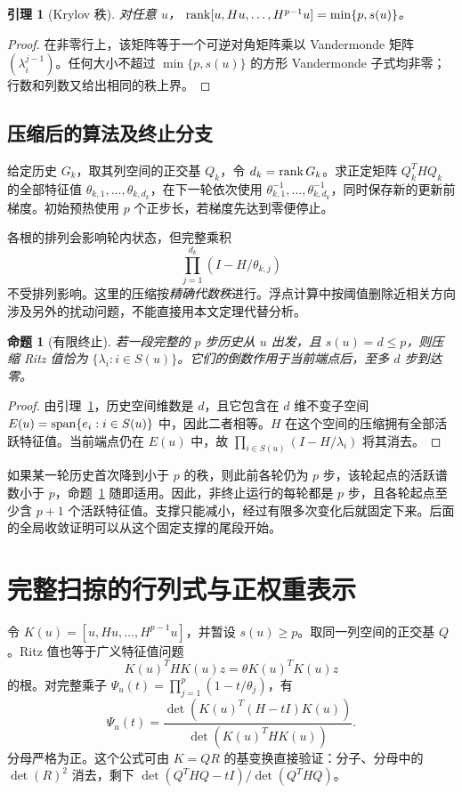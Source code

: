 \documentclass[UTF8,zihao=-4,a4paper]{ctexart}
\newtheorem{proposition}[theorem]{命题}
\newtheorem{lemma}[theorem]{引理}
\theoremstyle{definition}\newtheorem{example}[theorem]{例}
\begin{document}
\begin{lemma}[Krylov 秩]\label{lem:rank}
对任意 $u$，
$\operatorname{rank}[u,Hu,\ldots,H^{p-1}u]=\min\{p,s(u)\}$。
\end{lemma}
\begin{proof}
在非零行上，该矩阵等于一个可逆对角矩阵乘以 Vandermonde 矩阵
$(\lambda_i^{j-1})$。任何大小不超过 $\min\{p,s(u)\}$ 的方形 Vandermonde 子式均非零；行数和列数又给出相同的秩上界。
\end{proof}

\subsection{压缩后的算法及终止分支}

给定历史 $G_k$，取其列空间的正交基 $Q_k$，令 $d_k=\operatorname{rank} G_k$。求正定矩阵 $Q_k^THQ_k$ 的全部特征值
$\theta_{k,1},\ldots,\theta_{k,d_k}$，在下一轮依次使用
$\theta_{k,1}^{-1},\ldots,\theta_{k,d_k}^{-1}$，同时保存新的更新前梯度。初始预热使用 $p$ 个正步长，若梯度先达到零便停止。

各根的排列会影响轮内状态，但完整乘积
\[
 \prod_{j=1}^{d_k}(I-H/\theta_{k,j})
\]
不受排列影响。这里的压缩按\emph{精确代数秩}进行。浮点计算中按阈值删除近相关方向涉及另外的扰动问题，不能直接用本文定理代替分析。

\begin{proposition}[有限终止]\label{prop:finite}
若一段完整的 $p$ 步历史从 $u$ 出发，且 $s(u)=d\le p$，则压缩 Ritz 值恰为 $\{\lambda_i:i\in S(u)\}$。它们的倒数作用于当前端点后，至多 $d$ 步到达零。
\end{proposition}
\begin{proof}
由引理~\ref{lem:rank}，历史空间维数是 $d$，且它包含在 $d$ 维不变子空间
$E(u)=\operatorname{span}\{e_i:i\in S(u)\}$ 中，因此二者相等。$H$ 在这个空间的压缩拥有全部活跃特征值。当前端点仍在 $E(u)$ 中，故
$\prod_{i\in S(u)}(I-H/\lambda_i)$ 将其消去。
\end{proof}

如果某一轮历史首次降到小于 $p$ 的秩，则此前各轮仍为 $p$ 步，该轮起点的活跃谱数小于 $p$，命题~\ref{prop:finite} 随即适用。因此，非终止运行的每轮都是 $p$ 步，且各轮起点至少含 $p+1$ 个活跃特征值。支撑只能减小，经过有限多次变化后就固定下来。后面的全局收敛证明可以从这个固定支撑的尾段开始。

\section{完整扫掠的行列式与正权重表示}

令 $K(u)=[u,Hu,\ldots,H^{p-1}u]$，并暂设 $s(u)\ge p$。取同一列空间的正交基 $Q$。Ritz 值也等于广义特征值问题
\[
 K(u)^THK(u)z=\theta K(u)^TK(u)z
\]
的根。对完整乘子 $\Psi_u(t)=\prod_{j=1}^p(1-t/\theta_j)$，有
\begin{equation}\label{eq:det}
 \Psi_u(t)=\frac{\det(K(u)^T(H-tI)K(u))}
                    {\det(K(u)^THK(u))}.
\end{equation}
分母严格为正。这个公式可由 $K=QR$ 的基变换直接验证：分子、分母中的 $\det(R)^2$ 消去，剩下
$\det(Q^THQ-tI)/\det(Q^THQ)$。
\end{document}
